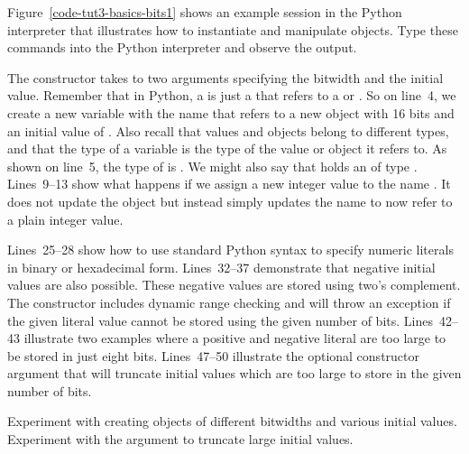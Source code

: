 \documentclass{cbxdoc}
\begin{document}
\begin{minipage}[t]{0.5\tw}
\setlength{\parskip}{0.5em}

  Figure~\ref{code-tut3-basics-bits1} shows an example session in the
  Python interpreter that illustrates how to instantiate and
  manipulate  objects. Type these commands into the Python
  interpreter and observe the output.

  The  constructor takes to two arguments specifying the
  bitwidth and the initial value. Remember that in Python, a
   is just a  that refers to a  or
  . So on line~4, we create a new variable with the name
   that refers to a new  object with 16 bits and an
  initial value of . Also recall that values and objects belong to
  different types, and that the type of a variable is the type of the
  value or object it refers to. As shown on line~5, the type of  is
  . We might also say that  holds an  of type
  . Lines~9--13 show what happens if we assign a new integer
  value to the name . It does not update the  object but
  instead simply updates the name  to now refer to a plain integer
  value.

  Lines~25--28 show how to use standard Python syntax to specify numeric
  literals in binary or hexadecimal form. Lines~32--37 demonstrate that
  negative initial values are also possible. These negative values are
  stored using two's complement. The  constructor includes
  dynamic range checking and will throw an exception if the given
  literal value cannot be stored using the given number of bits.
  Lines~42--43 illustrate two examples where a positive and negative
  literal are too large to be stored in just eight bits. Lines~47--50
  illustrate the optional  constructor  argument that
  will truncate initial values which are too large to store in the given
  number of bits.

  \begin{task}
    Experiment with creating  objects of different bitwidths and
    various initial values. Experiment with the  argument to
    truncate large initial values.
  \end{task}

\end{minipage}
\hfill
\begin{minipage}[t]{0.45\tw}
  \vspace{-0.1in}

  
\end{minipage}
\end{document}
